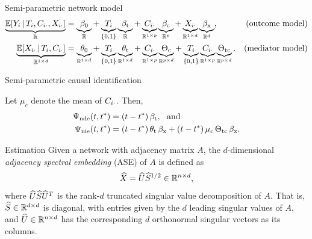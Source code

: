 \documentclass[final]{beamer}
\newlength{\colwidth}
\begin{document}
\begin{frame}[t]
\begin{columns}[t]
\begin{column}{\colwidth}
\begin{block}{Semi-parametric network model}
    \begin{equation*} 
      \begin{aligned}
            \underbrace{\E[T_i, \C_{i \cdot}, \X_{i \cdot}]{Y_i}}_{\R}
              & = \underbrace{\betazero}_{\R}
            + \underbrace{T_i}_{\{0, 1\}} \underbrace{\betat}_{\R}
            + \underbrace{\C_{i \cdot}}_{\R^{1 \times p}} \underbrace{\betac}_{\R^{p}}
            + \underbrace{\X_{i \cdot}}_{\R^{1 \times d}} \underbrace{\betax}_{\R^d},
              & \text{(outcome model)}                      \\
            \underbrace{\E[T_i, \C_{i \cdot}]{\X_{i \cdot}}}_{\R^{1 \times d}}
              & = \underbrace{\thetazero}_{\R^{1 \times d}}
            + \underbrace{T_i}_{\{0, 1\}} \underbrace{\thetat}_{\R^{1 \times d}}
            + \underbrace{\C_{i \cdot}}_{\R^{1 \times p}} \underbrace{\Thetac}_{\R^{p \times d}}
            + \underbrace{T_i}_{\{0, 1\}} \underbrace{\C_{i \cdot}}_{\R^{1 \times p}} \underbrace{\Thetatc}_{\R^{p \times d}}.
              & \text{(mediator model)}
      \end{aligned}
    \end{equation*}
  \end{block}

  \begin{block}{Semi-parametric causal identification}

    
    Let $\mu_c$ denote the mean of $C_{i \cdot}$. Then,
    \begin{align*}
        \ndef & = \paren*{t - t^*} \, \betat, ~ \text{ and }                                    \\
        \nief & = \paren*{t - t^*} \, \thetat \, \betax + (t - t^*) \, \mu_c \, \Thetatc \, \betax. 
    \end{align*}

  \end{block}

  \begin{block}{Estimation}
    Given a network with adjacency matrix $A$, the $d$-dimensional \emph{adjacency spectral embedding} (ASE) of $A$ is defined as
    \begin{equation*}
        \widehat{X} = \widehat{U} \widehat{S}^{1/2} \in \mathbb{R}^{n \times d},
    \end{equation*}
    where $\widehat{U} \widehat{S} \widehat{U}^T$ is the rank-$d$ truncated singular value decomposition of $A$. That is, $\widehat{S} \in \mathbb{R}^{d \times d}$ is diagonal, with entries given by the $d$ leading singular values of $A$, and $\widehat{U} \in \mathbb{R}^{n \times d}$ has the corresponding $d$ orthonormal singular vectors as its columns.


\end{block}
\end{column}
\end{columns}
\end{frame}
\end{document}
